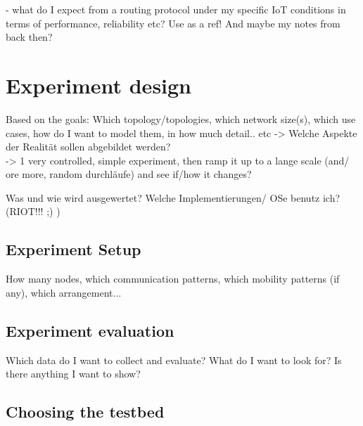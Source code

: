 \documentclass{acm_proc_article-sp}
\begin{document}
- what do I expect from a routing protocol under my specific IoT conditions in terms of performance, reliability etc?
Use \cite{RFC-2501} as a ref! And maybe my notes from back then?

\section{Experiment design}
\label{sec:Design}
Based on the goals: Which topology/topologies, which network size(s), which use cases, how do I want to model them, in how much detail.. etc -> Welche Aspekte der Realität sollen abgebildet werden?\\
-> 1 very controlled, simple experiment, then ramp it up to a lange scale (and/ ore more, random durchläufe) and see if/how it changes?

Was und wie wird ausgewertet? Welche Implementierungen/ OSe benutz ich? (RIOT!!! ;) )

\subsection{Experiment Setup}
\label{subsec:setup}
How many nodes, which communication patterns, which mobility patterns (if any), which arrangement...

\subsection{Experiment evaluation}
\label{subsec:evaluation}
Which data do I want to collect and evaluate? What do I want to look for? Is there anything I want to show?


\subsection{Choosing the testbed}
\label{subsec:testbed_choice}
\end{document}
